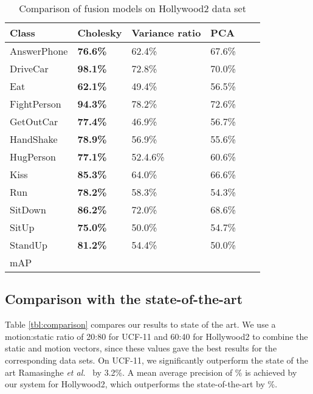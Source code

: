 \begin{table}[]
\centering
\caption{Comparison of fusion models on Hollywood2 data set}\label{tbl:per-action fusionhollywood}
\begin{tabular}{|l||l|l|l|l|l|}
\hline
Class            & Cholesky & Variance ratio & PCA   \\ \hline  \hline
AnswerPhone      & \textbf{76.6\%}& 62.4\%    & 67.6\%           \\
DriveCar         & \textbf{98.1\%}& 72.8\%    & 70.0\%       \\
Eat              & \textbf{62.1\%}& 49.4\%    & 56.5\%          \\
FightPerson      & \textbf{94.3\%}& 78.2\%    & 72.6\%         \\
GetOutCar        & \textbf{77.4\%}& 46.9\%    & 56.7\%          \\
HandShake        & \textbf{78.9\%}         & 56.9\%    & 55.6\%            \\
HugPerson        & \textbf{77.1\%}& 52.4.6\%    & 60.6\%            \\
Kiss             &\textbf{85.3\%}         & 64.0\%    & 66.6\%           \\
Run              & \textbf{78.2\%}         & 58.3\%    & 54.3\%            \\
SitDown          & \textbf{86.2\%}         & 72.0\%    & 68.6\%            \\
SitUp            & \textbf{75.0\%}         & 50.0\%    & 54.7\%          \\
StandUp          & \textbf{81.2\%}         & 54.4\%    & 50.0\%          \\ \hline
mAP              &                &           &                    \\ \hline
\end{tabular}
\end{table}


\subsection{Comparison with the state-of-the-art}

Table \ref{tbl:comparison} compares our results to state of the art. We use a motion:static ratio of 20:80 for UCF-11 and 60:40
for Hollywood2 to combine the static and motion vectors,
since these values gave the best results for the corresponding data sets. On UCF-11, we significantly outperform
the state of the art Ramasinghe \emph{et al.}~\cite{7486474} by 3.2\%. A mean average precision of \% is achieved by our system for Hollywood2, which outperforms
the state-of-the-art by \%.

